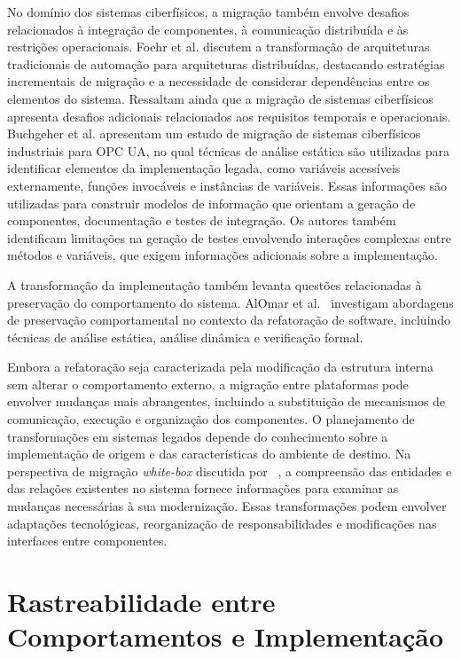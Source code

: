 No domínio dos sistemas ciberfísicos, a migração também envolve desafios relacionados à integração de componentes, à comunicação distribuída e às restrições operacionais. Foehr et al. \cite{Foehr2017} discutem a transformação de arquiteturas tradicionais de automação para arquiteturas distribuídas, destacando estratégias incrementais de migração e a necessidade de considerar dependências entre os elementos do sistema. Ressaltam ainda que a migração de sistemas ciberfísicos apresenta desafios adicionais relacionados aos requisitos temporais e operacionais.
 Buchgeher et al. \cite{BUCHGEHER2022276} apresentam um estudo de migração de sistemas ciberfísicos industriais para OPC UA, no qual técnicas de análise estática são utilizadas para identificar elementos da implementação legada, como variáveis acessíveis externamente, funções invocáveis e instâncias de variáveis. Essas informações são utilizadas para construir modelos de informação que orientam a geração de componentes, documentação e testes de integração. Os autores também identificam limitações na geração de testes envolvendo interações complexas entre métodos e variáveis, que exigem informações adicionais sobre a implementação.

A transformação da implementação também levanta questões relacionadas à preservação do comportamento do sistema. AlOmar et al.~\cite{AlOmar2021} investigam abordagens de preservação comportamental no contexto da refatoração de software, incluindo técnicas de análise estática, análise dinâmica e verificação formal.

Embora a refatoração seja caracterizada pela modificação da estrutura interna sem alterar o comportamento externo, a migração entre plataformas pode envolver mudanças mais abrangentes, incluindo a substituição de mecanismos de comunicação, execução e organização dos componentes. O planejamento de transformações em sistemas legados depende do conhecimento sobre a implementação de origem e das características do ambiente de destino. Na perspectiva de migração \textit{white-box} discutida por ~\cite{BragagnoloMigration}, a compreensão das entidades e das relações existentes no sistema fornece informações para examinar as mudanças necessárias à sua modernização. Essas transformações podem envolver adaptações tecnológicas, reorganização de responsabilidades e modificações nas interfaces entre componentes.

\section{Rastreabilidade entre Comportamentos e Implementação}

